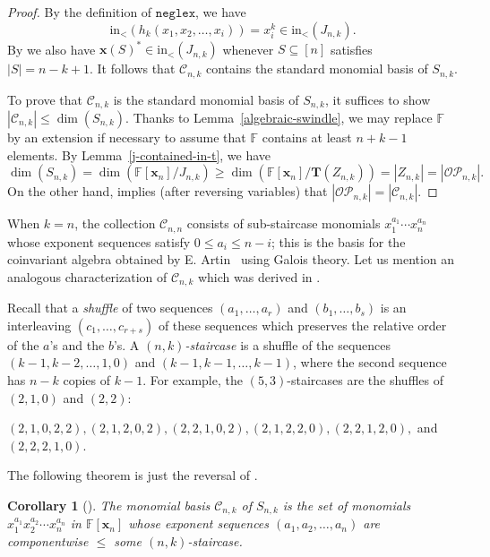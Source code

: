 \documentclass[10pt]{amsart}
\newtheorem{corollary}[theorem]{Corollary}
\theoremstyle{definition}
\newcommand{\init}{{\mathrm {in}}}
\newcommand{\neglex}{{\mathtt {neglex}}}
\newcommand{\OP}{{\mathcal{OP}}}
\newcommand{\FF}{{\mathbb{F}}}
\newcommand{\CCC}{{\mathcal{C}}}
\newcommand{\xx}{{\mathbf {x}}}
\newcommand{\TT}{{\mathbf {T}}}
\begin{document}
\begin{proof}
By the definition of $\neglex$, we have
\begin{equation}
\init_<(h_k(x_1, x_2, \dots, x_i)) = x_i^k \in \init_<(J_{n,k}).
\end{equation}
By \cite[Lem. 3.4, Lem. 3.5]{HRS} we also have $\xx(S)^* \in \init_<(J_{n,k})$ whenever $S \subseteq [n]$
satisfies $|S| = n-k+1$.  It follows that $\CCC_{n,k}$ contains the standard monomial basis of $S_{n,k}$.

To prove that $\CCC_{n,k}$ is the standard monomial basis of $S_{n,k}$, it suffices to show
$|\CCC_{n,k}| \leq \dim(S_{n,k})$.  Thanks to Lemma~\ref{algebraic-swindle}, we may replace $\FF$ by an extension
if necessary to assume that $\FF$ contains at least $n+k-1$ elements.
By Lemma~\ref{j-contained-in-t}, we have 
\begin{equation}
\dim(S_{n,k}) = \dim \left( {\FF[\xx_n]} / {J_{n,k}} \right) 
\geq \dim \left( {\FF[\xx_n]} / {\TT(Z_{n,k})} \right) = |Z_{n,k}| = |\OP_{n,k}|.
\end{equation}
On the other hand, \cite[Thm. 4.9]{HRS} implies (after reversing variables) that
$|\OP_{n,k}| = |\CCC_{n,k}|$.
\end{proof}


When $k = n$, the collection $\CCC_{n,n}$ consists of sub-staircase monomials 
$x_1^{a_1} \cdots x_n^{a_n}$ whose exponent sequences satisfy $0 \leq a_i \leq n-i$; 
this is the basis for the coinvariant algebra obtained by E. Artin~\cite{Artin} using Galois theory.
Let us mention an analogous characterization of $\CCC_{n,k}$ which was derived in \cite{HRS}.

Recall that a \emph{shuffle} of two sequences $(a_1, \dots, a_r)$ and $(b_1, \dots, b_s)$ 
is an interleaving $(c_1, \dots, c_{r+s})$ of these sequences which preserves the relative order
of the $a$'s and the $b$'s.  
A \emph{$(n,k)$-staircase} is a shuffle of the sequences
$(k-1, k-2, \dots, 1, 0)$ and $(k-1, k-1, \dots, k-1)$, where the second sequence has $n-k$ copies of $k-1$.
For example, the $(5,3)$-staircases are the shuffles of $(2,1,0)$ and $(2,2)$:
\begin{center}
$(2,1,0,2,2), (2,1,2,0,2), (2,2,1,0,2), (2,1,2,2,0), (2,2,1,2,0),$ and $(2,2,2,1,0)$.
\end{center}
The following theorem is just the reversal of \cite[Thm. 4.13]{HRS}.

\begin{corollary}[{\cite[Thm. 4.13]{HRS}}]
\label{staircase-standard} 
The monomial basis $\CCC_{n,k}$ of $S_{n,k}$ is the set of monomials $x_1^{a_1} x_2^{a_2} \cdots x_n^{a_n}$
in $\FF[\xx_n]$  whose exponent sequences $(a_1, a_2, \dots, a_n)$
are componentwise $\leq$ \emph{some} $(n,k)$-staircase.
\end{corollary}
\end{document}
